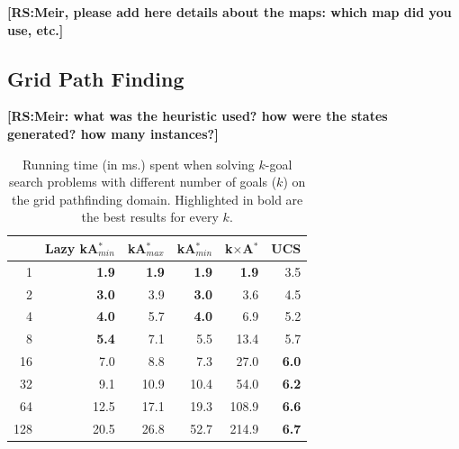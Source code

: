 \documentclass{aicom2e}
\newcommand{\kgs}{$k$-goal search}
\newcommand{\kastarmin}{kA$^*_{min}$}
\newcommand{\kastarmax}{kA$^*_{max}$}
\newcommand{\kxastar}{k$\times$A$^*$}
\newcommand{\roni}[1]{\textbf{[RS:#1]}}
\begin{document}
\roni{Meir, please add here details about the maps: which map did you use, etc.}
\subsection{Grid Path Finding}
\roni{Meir: what was the heuristic used? how were the states generated? how many instances?}

\begin{table}[]
    \centering
    \begin{tabular}{|r|r|r|r|r|r|}
    \hline
        & \multicolumn{1}{c|}{Lazy \kastarmin{}} & \kastarmax &      \kastarmin       &  \kxastar & UCS       \\

        \hline
1     & \textbf{1.9}                 & \textbf{1.9} & \textbf{1.9} & \textbf{1.9} & 3.5          \\
2     & \textbf{3.0}                 & 3.9          & \textbf{3.0} & 3.6          & 4.5          \\
4     & \textbf{4.0}                 & 5.7          & \textbf{4.0} & 6.9          & 5.2          \\
8     & \textbf{5.4}                 & 7.1          & 5.5          & 13.4         & 5.7          \\
16    & 7.0                          & 8.8          & 7.3          & 27.0         & \textbf{6.0} \\
32    & 9.1                          & 10.9         & 10.4         & 54.0         & \textbf{6.2} \\
64    & 12.5                         & 17.1         & 19.3         & 108.9        & \textbf{6.6} \\
128   & 20.5                         & 26.8         & 52.7         & 214.9 &
\textbf{6.7}\\
\hline
    \end{tabular}
    \caption{Running time (in ms.) spent when solving \kgs{} problems with different number of goals ($k$) on the grid pathfinding domain. Highlighted in bold are the best results for every $k$.}
    \label{tab:pathfinding-runtime}
\end{table}
\end{document}
